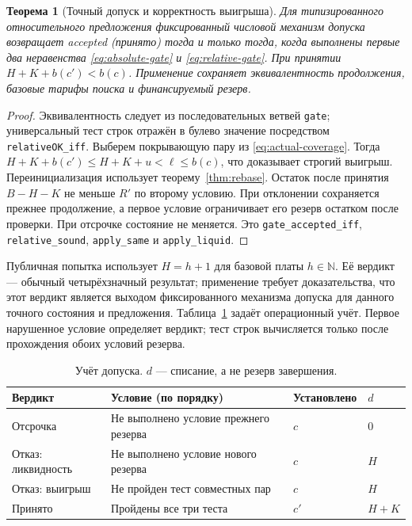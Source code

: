 \documentclass[10pt,a4paper]{article}
\newtheorem{theorem}{Теорема}[section]
\newcommand{\Nat}{\mathbb N}
\newcommand{\rc}[1]{\allowbreak\texttt{#1}\allowbreak}
\begin{document}
\begin{theorem}[Точный допуск и корректность выигрыша]\label{thm:gate}
Для типизированного относительного предложения фиксированный числовой механизм допуска возвращает \emph{accepted} (принято) тогда и только тогда, когда выполнены первые два неравенства \eqref{eq:absolute-gate} и \eqref{eq:relative-gate}. При принятии $H+K+b(c')<b(c)$. Применение сохраняет эквивалентность продолжения, базовые тарифы поиска и финансируемый резерв.
\end{theorem}
\begin{proof}
Эквивалентность следует из последовательных ветвей \rc{gate}; универсальный тест строк отражён в булево значение посредством \rc{relativeOK\_iff}. Выберем покрывающую пару из \eqref{eq:actual-coverage}. Тогда $H+K+b(c')\le H+K+u<\ell\le b(c)$, что доказывает строгий выигрыш. Переинициализация использует теорему~\ref{thm:rebase}. Остаток после принятия $B-H-K$ не меньше $R'$ по второму условию. При отклонении сохраняется прежнее продолжение, а первое условие ограничивает его резерв остатком после проверки. При отсрочке состояние не меняется. Это \rc{gate\_accepted\_iff}, \rc{relative\_sound}, \rc{apply\_same} и \rc{apply\_liquid}.
\end{proof}

Публичная попытка использует $H=h+1$ для базовой платы $h\in\Nat$. Её вердикт --- обычный четырёхзначный результат; применение требует доказательства, что этот вердикт является выходом фиксированного механизма допуска для данного точного состояния и предложения. Таблица~\ref{tab:debit} задаёт операционный учёт. Первое нарушенное условие определяет вердикт; тест строк вычисляется только после прохождения обоих условий резерва.
\begin{table}[htbp]
\centering\small
\caption{Учёт допуска. $d$ --- списание, а не резерв завершения.}\label{tab:debit}
\begin{tabularx}{\linewidth}{@{}lXll@{}}\toprule
Вердикт & Условие (по порядку) & Установлено & $d$\\\midrule
Отсрочка & Не выполнено условие прежнего резерва & $c$ & $0$\\
Отказ: ликвидность & Не выполнено условие нового резерва & $c$ & $H$\\
Отказ: выигрыш & Не пройден тест совместных пар & $c$ & $H$\\
Принято & Пройдены все три теста & $c'$ & $H+K$\\\bottomrule
\end{tabularx}
\end{table}
\end{document}
